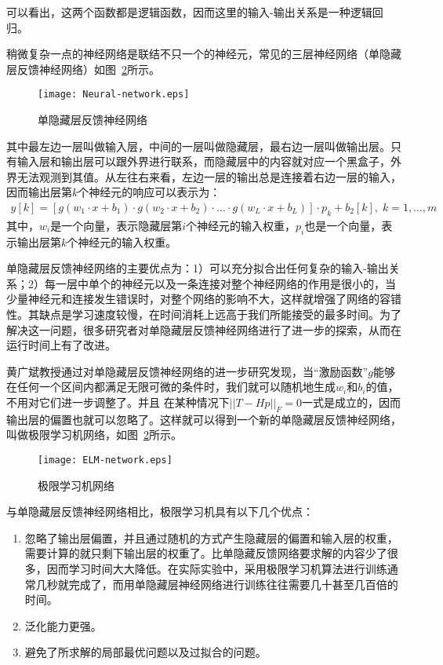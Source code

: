 可以看出，这两个函数都是逻辑函数，因而这里的输入-输出关系是一种逻辑回归。

稍微复杂一点的神经网络是联结不只一个的神经元，常见的三层神经网络（单隐藏层反馈神经网络）如图~\ref{fig: ELM-network}所示。

\begin{figure}
\centering
\texttt{[image: Neural-network.eps]}
\caption{单隐藏层反馈神经网络}
\label{fig: Neural-network}
\end{figure}

其中最左边一层叫做输入层，中间的一层叫做隐藏层，最右边一层叫做输出层。只有输入层和输出层可以跟外界进行联系，而隐藏层中的内容就对应一个黑盒子，外界无法观测到其值。从左往右来看，左边一层的输出总是连接着右边一层的输入，因而输出层第$k$个神经元的响应可以表示为：
\begin{align}
y[k] = [g(w_1 \cdot x + b_1) \cdot g(w_2 \cdot x + b_2) \cdot \ldots \cdot g(w_L \cdot x + b_L)] \cdot p_k + b_2[k], \; k = 1, \ldots, m
\end{align}
其中，$w_i$是一个向量，表示隐藏层第$i$个神经元的输入权重，$p_i$也是一个向量，表示输出层第$k$个神经元的输入权重。

单隐藏层反馈神经网络的主要优点为：1）可以充分拟合出任何复杂的输入-输出关系；2）每一层中单个的神经元以及一条连接对整个神经网络的作用是很小的，当少量神经元和连接发生错误时，对整个网络的影响不大，这样就增强了网络的容错性。其缺点是学习速度较慢，在时间消耗上远高于我们所能接受的最多时间。为了解决这一问题，很多研究者对单隐藏层反馈神经网络进行了进一步的探索，从而在运行时间上有了改进。

黄广斌教授通过对单隐藏层反馈神经网络的进一步研究发现，当“激励函数”$g$能够在任何一个区间内都满足无限可微的条件时，我们就可以随机地生成$w_i$和$b_i$的值，不用对它们进一步调整了。并且 在某种情况下$||T - Hp||_F = 0$一式是成立的，因而输出层的偏置也就可以忽略了。这样就可以得到一个新的单隐藏层反馈神经网络，叫做极限学习机网络，如图~\ref{fig: ELM-network}所示。
\begin{figure}
\centering
\texttt{[image: ELM-network.eps]}
\caption{极限学习机网络}
\label{fig: ELM-network}
\end{figure}

与单隐藏层反馈神经网络相比，极限学习机具有以下几个优点：
\begin{enumerate}
\item 忽略了输出层偏置，并且通过随机的方式产生隐藏层的偏置和输入层的权重，需要计算的就只剩下输出层的权重了。比单隐藏反馈网络要求解的内容少了很多，因而学习时间大大降低。在实际实验中，采用极限学习机算法进行训练通常几秒就完成了，而用单隐藏层神经网络进行训练往往需要几十甚至几百倍的时间。
\item 泛化能力更强。
\item 避免了所求解的局部最优问题以及过拟合的问题。
\end{enumerate}

